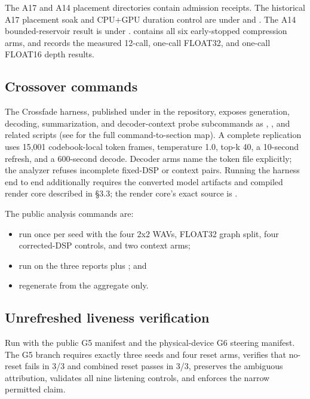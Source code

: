 \documentclass[10pt]{article}
\begin{document}
The A17 and A14 placement directories contain admission receipts. The historical A17 placement soak and CPU+GPU duration control are under \texttt{} and \texttt{}. The A14 bounded-reservoir result is under \texttt{}. \texttt{} contains all six early-stopped compression arms, and \texttt{} records the measured 12-call, one-call FLOAT32, and one-call FLOAT16 depth results.

\subsection{Crossover commands}
The Crossfade harness, published under \texttt{} in the repository, exposes generation, decoding, summarization, and decoder-context probe subcommands as \texttt{}, \texttt{}, and related scripts (see \texttt{} for the full command-to-section map). A complete replication uses 15,001 codebook-local token frames, temperature 1.0, top-k 40, a 10-second refresh, and a 600-second decode. Decoder arms name the token file explicitly; the analyzer refuses incomplete fixed-DSP or context pairs. Running the harness end to end additionally requires the converted model artifacts and compiled render core described in §3.3; the render core's exact source is \texttt{}.

The public analysis commands are:

\begin{itemize}
\item run \texttt{} once per seed with the four 2x2 WAVs, FLOAT32 graph split, four corrected-DSP controls, and two context arms;
\item run \texttt{} on the three reports plus \texttt{}; and
\item regenerate \texttt{} from the aggregate only.
\end{itemize}
\subsection{Unrefreshed liveness verification}
Run \texttt{} with the public G5 manifest and the physical-device G6 steering manifest. The G5 branch requires exactly three seeds and four reset arms, verifies that no-reset fails in 3/3 and combined reset passes in 3/3, preserves the ambiguous attribution, validates all nine listening controls, and enforces the narrow permitted claim.
\end{document}
